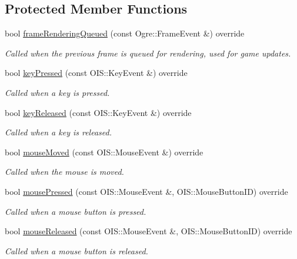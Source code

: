 \subsection*{Protected Member Functions}
\begin{DoxyCompactItemize}
\item 
bool \hyperlink{class_game_a7595cce82f9d32a21ac96663d5927e2b}{frame\+Rendering\+Queued} (const Ogre\+::\+Frame\+Event \&) override
\begin{DoxyCompactList}\small\item\em Called when the previous frame is queued for rendering, used for game updates. \end{DoxyCompactList}\item 
bool \hyperlink{class_game_afa42cb4d67e91e865f0df410a3950c33}{key\+Pressed} (const O\+I\+S\+::\+Key\+Event \&) override
\begin{DoxyCompactList}\small\item\em Called when a key is pressed. \end{DoxyCompactList}\item 
bool \hyperlink{class_game_a30dbe1a49eeef33b8bfdba3275e03b81}{key\+Released} (const O\+I\+S\+::\+Key\+Event \&) override
\begin{DoxyCompactList}\small\item\em Called when a key is released. \end{DoxyCompactList}\item 
bool \hyperlink{class_game_af65edfac010ab689d4f1750de04a3635}{mouse\+Moved} (const O\+I\+S\+::\+Mouse\+Event \&) override
\begin{DoxyCompactList}\small\item\em Called when the mouse is moved. \end{DoxyCompactList}\item 
bool \hyperlink{class_game_a08e8d993e88ef586468a19ad3c45479c}{mouse\+Pressed} (const O\+I\+S\+::\+Mouse\+Event \&, O\+I\+S\+::\+Mouse\+Button\+ID) override
\begin{DoxyCompactList}\small\item\em Called when a mouse button is pressed. \end{DoxyCompactList}\item 
bool \hyperlink{class_game_a32b8ef3a9f1d9103ad4560ca212c2ab1}{mouse\+Released} (const O\+I\+S\+::\+Mouse\+Event \&, O\+I\+S\+::\+Mouse\+Button\+ID) override
\begin{DoxyCompactList}\small\item\em Called when a mouse button is released. \end{DoxyCompactList}\item 

\end{DoxyCompactItemize}

